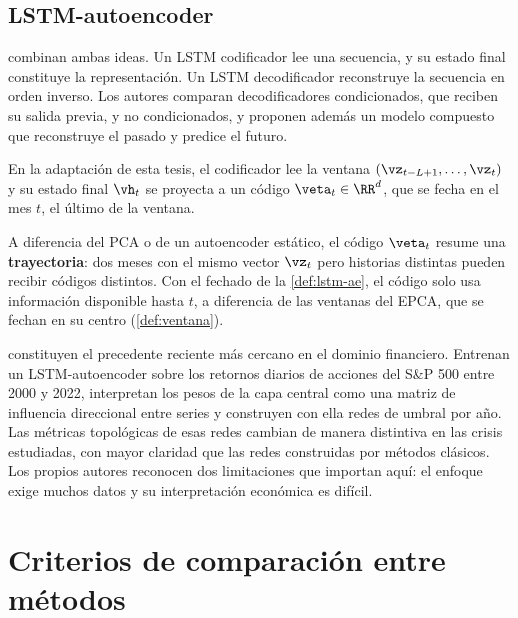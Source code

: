 \subsection{LSTM-autoencoder}

\textcite{srivastava_mansimov_salakhutdinov_2015} combinan ambas ideas. Un LSTM codificador lee una secuencia, y su estado final
constituye la representación. Un LSTM decodificador reconstruye la secuencia en orden inverso. Los
autores comparan decodificadores condicionados, que reciben su salida previa, y no condicionados,
y proponen además un modelo compuesto que reconstruye el pasado y predice el futuro.

\begin{definicion}\label{def:lstm-ae}
En la adaptación de esta tesis, el codificador lee la ventana $(\vz_{t-L+1},\dots,\vz_t)$ y su
estado final $\vh_t$ se proyecta a un código $\veta_t\in\RR^{d}$, que se fecha en el mes $t$, el
último de la ventana.
\end{definicion}

A diferencia del PCA o de un autoencoder estático, el código $\veta_t$ resume una
\textbf{trayectoria}: dos meses con el mismo vector $\vz_t$ pero historias distintas pueden recibir
códigos distintos. Con el fechado de la \cref{def:lstm-ae}, el código solo usa información
disponible hasta $t$, a diferencia de las ventanas del EPCA, que se fechan en su centro
(\cref{def:ventana}).

\textcite{tuhin_et_al_2025}
constituyen el precedente reciente más cercano en el dominio financiero. Entrenan un
LSTM-autoencoder sobre los retornos diarios de acciones del S\&P 500 entre 2000 y 2022, interpretan
los pesos de la capa central como una matriz de influencia direccional entre series y construyen con
ella redes de umbral por año. Las métricas topológicas de esas redes cambian de manera distintiva en
las crisis estudiadas, con mayor claridad que las redes construidas por métodos clásicos. Los
propios autores reconocen dos limitaciones que importan aquí: el enfoque exige muchos datos y su
interpretación económica es difícil.

\section{Criterios de comparación entre métodos}
\label{sec:criterios}

